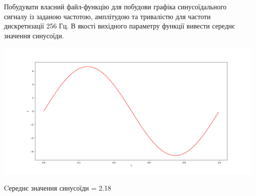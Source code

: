 \documentclass[a4paper,12pt]{article}
\begin{document}
\begin{center}
\textbf{}\par
\end{center}
 Побудувати власний файл-функцію для побудови графіка синусоїдального сигналу із заданою частотою, амплітудою та тривалістю для частоти дискретизації 256 Гц. В якості вихідного параметру функції вивести середнє значення синусоїди. \par


\begin{center}
\includegraphics[height = 12 cm, width=18 cm]{8.png}\par
\vspace{1cm}
\end{center}
Cереднє значення синусоїди = 2.18
\end{document}

